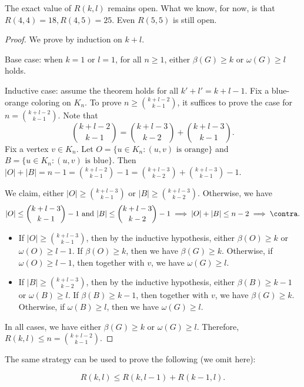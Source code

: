 \begin{note}
	The exact value of $R(k,l)$ remains open. What we know, for now, is that $R(4,4) =18, R(4,5) = 25$. Even $R(5,5)$ is still open.
\end{note}

\begin{proof}
	We prove by induction on $k+l$.

	Base case: when $k=1$ or $l=1$, for all $n\ge 1$, either $\beta(G)\ge k$ or $\omega(G)\ge l$ holds.

	Inductive case: assume the theorem holds for all $k'+l' = k+l-1$.
	Fix a blue-orange coloring on $K_n$. To prove $n\ge \binom{k+l-2}{k-1}$, it suffices to prove the case for $n = \binom{k+l-2}{k-1}$.
	Note that
	\[ \binom{k+l-2}{k-1} = \binom{k+l-3}{k-2} + \binom{k+l-3}{k-1}. \]
	Fix a vertex $v\in K_n$. Let $O = \{u\in K_n: (u,v) \text{ is orange}\}$ and
	$B = \{u\in K_n: (u,v) \text{ is blue}\}$. Then $|O| + |B| = n-1 = \binom{k+l-2}{k-1}-1 = \binom{k+l-3}{k-2} + \binom{k+l-3}{k-1}-1$.

	We claim, either $|O|\ge \binom{k+l-3}{k-1}$ or $|B|\ge \binom{k+l-3}{k-2}$. Otherwise, we have
	\[ |O| \le \binom{k+l-3}{k-1} - 1 \text{ and } |B| \le \binom{k+l-3}{k-2} -1 \implies |O| + |B| \le n-2 \implies \contra. \]

	\begin{itemize}
		\item If $|O|\ge \binom{k+l-3}{k-1}$, then by the inductive hypothesis, either $\beta(O)\ge k$ or $\omega(O)\ge l-1$. If $\beta(O)\ge k$, then we have $\beta(G)\ge k$. Otherwise, if $\omega(O)\ge l-1$, then together with $v$, we have $\omega(G)\ge l$.
		\item If $|B|\ge \binom{k+l-3}{k-2}$, then by the inductive hypothesis, either $\beta(B)\ge k-1$ or $\omega(B)\ge l$. If $\beta(B)\ge k-1$, then together with $v$, we have $\beta(G)\ge k$. Otherwise, if $\omega(B)\ge l$, then we have $\omega(G)\ge l$.
	\end{itemize}
	In all cases, we have either $\beta(G)\ge k$ or $\omega(G)\ge l$. Therefore, $R(k,l) \le n = \binom{k+l-2}{k-1}$.
\end{proof}

The same strategy can be used to prove the following (we omit here):
\begin{theorem}
	\[ R(k,l) \le R(k,l-1) + R(k-1,l).\]
\end{theorem}
